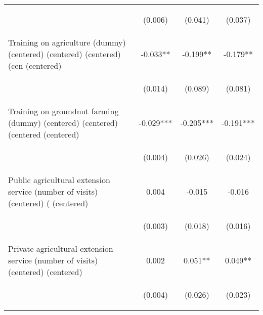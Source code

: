 \begin{center}
\begin{tabular}{lccc}
\vspace{4pt} & \begin{footnotesize}(0.006)\end{footnotesize} & \begin{footnotesize}(0.041)\end{footnotesize} & \begin{footnotesize}(0.037)\end{footnotesize} \\
Training on agriculture (dummy) (centered) (centered) (centered) (cen (centered) & -0.033** & -0.199** & -0.179** \\
\vspace{4pt} & \begin{footnotesize}(0.014)\end{footnotesize} & \begin{footnotesize}(0.089)\end{footnotesize} & \begin{footnotesize}(0.081)\end{footnotesize} \\
Training on groundnut farming (dummy) (centered) (centered) (centered (centered) & -0.029*** & -0.205*** & -0.191*** \\
\vspace{4pt} & \begin{footnotesize}(0.004)\end{footnotesize} & \begin{footnotesize}(0.026)\end{footnotesize} & \begin{footnotesize}(0.024)\end{footnotesize} \\
Public agricultural extension service (number of visits) (centered) ( (centered) & 0.004 & -0.015 & -0.016 \\
\vspace{4pt} & \begin{footnotesize}(0.003)\end{footnotesize} & \begin{footnotesize}(0.018)\end{footnotesize} & \begin{footnotesize}(0.016)\end{footnotesize} \\
Private agricultural extension service (number of visits) (centered)  (centered) & 0.002 & 0.051** & 0.049** \\
\vspace{4pt} & \begin{footnotesize}(0.004)\end{footnotesize} & \begin{footnotesize}(0.026)\end{footnotesize} & \begin{footnotesize}(0.023)\end{footnotesize} \\

\end{tabular}
\end{center}

